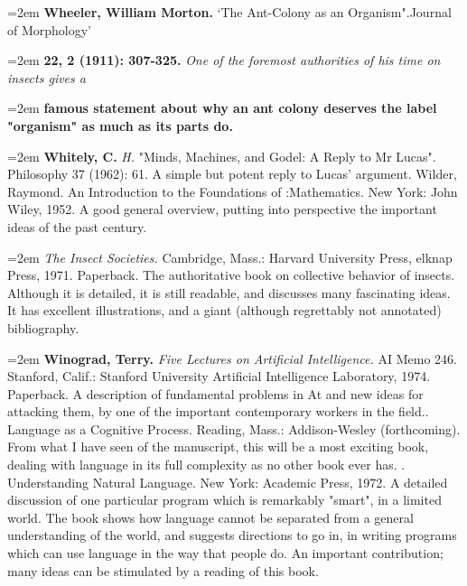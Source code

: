 \par\noindent\hangindent=2em {\bf Wheeler, William Morton.} `The Ant-Colony as an Organism".Journal of Morphology' 

\par\noindent\hangindent=2em {\bf 22, 2 (1911): 307-325.} {\it One of the foremost authorities of his time on insects gives a} 

\par\noindent\hangindent=2em {\bf famous statement about why an ant colony deserves the label "organism" as much as its parts do.} {\it } 

\par\noindent\hangindent=2em {\bf Whitely, C.} {\it H.} "Minds, Machines, and Godel: A Reply to Mr Lucas". Philosophy 37 (1962): 61. A simple but potent reply to Lucas' argument. Wilder, Raymond. An Introduction to the Foundations of :Mathematics. New York: John Wiley, 1952. A good general overview, putting into perspective the important ideas of the past century.

\par\noindent\hangindent=2em  {\it The Insect Societies.} Cambridge, Mass.: Harvard University Press, elknap Press, 1971. Paperback. The authoritative book on collective behavior of insects. Although it is detailed, it is still readable, and discusses many fascinating ideas. It has excellent illustrations, and a giant (although regrettably not annotated) bibliography.

\par\noindent\hangindent=2em {\bf Winograd, Terry.} {\it Five Lectures on Artificial Intelligence.} AI Memo 246. Stanford, Calif.: Stanford University Artificial Intelligence Laboratory, 1974. Paperback. A description of fundamental problems in At and new ideas for attacking them, by one of the important contemporary workers in the field.. Language as a Cognitive Process. Reading, Mass.: Addison-Wesley (forthcoming). From what I have seen of the manuscript, this will be a most exciting book, dealing with language in its full complexity as no other book ever has. . Understanding Natural Language. New York: Academic Press, 1972. A detailed discussion of one particular program which is remarkably "smart", in a limited world. The book shows how language cannot be separated from a general understanding of the world, and suggests directions to go in, in writing programs which can use language in the way that people do. An important contribution; many ideas can be stimulated by a reading of this book.


